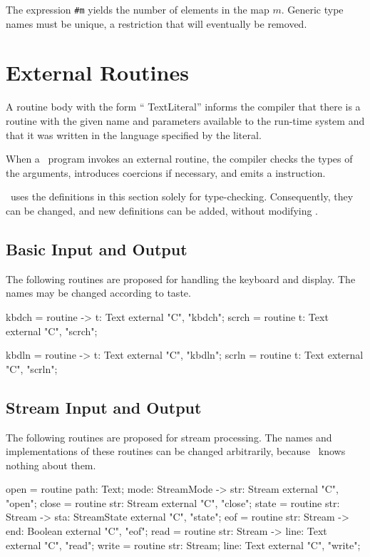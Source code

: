 \documentclass{scrartcl}
\begin{document}
The expression \lstinline'#m' yields the number of elements in the map $m$.  Generic type names must be unique, a restriction that will eventually be removed.

\section{External Routines}

A routine body with the form `` \textsf{TextLiteral}'' informs the compiler that there is a routine with the given name and parameters available to the run-time system and that it was written in the language specified by the  literal.

When a \desi\ program invokes an external routine, the compiler checks the types of the arguments, introduces coercions if necessary, and emits a  instruction.

\udc\ uses the definitions in this section solely for type-checking.  Consequently, they can be changed, and new definitions can be added, without modifying \udc.

\subsection{Basic Input and Output}

The following routines are proposed for handling the keyboard and display.  The names may be changed according to taste.  
\begin{code}
kbdch = routine -> t: Text external "C", "kbdch";
scrch = routine t: Text external "C", "scrch";

kbdln = routine -> t: Text external "C", "kbdln";
scrln = routine t: Text external "C", "scrln";
\end{code}

\subsection{Stream Input and Output}
\label{sec-stream-io}

The following routines are proposed for stream processing.  The names and implementations of these routines can be changed arbitrarily, because \udc\ knows nothing about them.
\begin{code}
open  = routine path: Text; mode: StreamMode -> str: Stream external "C", "open";
close = routine str: Stream external "C", "close";
state = routine str: Stream -> sta: StreamState external "C", "state";
eof   = routine str: Stream -> end: Boolean external "C", "eof";
read  = routine str: Stream -> line: Text external "C", "read";
write = routine str: Stream; line: Text external "C", "write";
\end{code}
\end{document}
